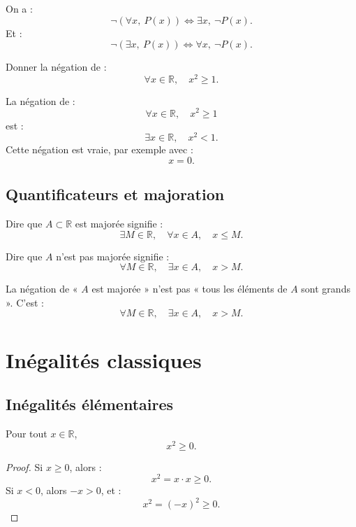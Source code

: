 \documentclass[11pt,a4paper]{article}
\newcommand{\R}{\mathbb R}
\newcommand{\ssi}{\Longleftrightarrow}
\begin{document}
\begin{theorembox}[Négation]
On a :
\[
\neg(\forall x,\ P(x))
\ssi
\exists x,\ \neg P(x).
\]
Et :
\[
\neg(\exists x,\ P(x))
\ssi
\forall x,\ \neg P(x).
\]
\end{theorembox}

\begin{exercicebox}[Négation]
Donner la négation de :
\[
\forall x\in\R,\quad x^2\geq1.
\]
\end{exercicebox}

\begin{correctionbox}
La négation de :
\[
\forall x\in\R,\quad x^2\geq1
\]
est :
\[
\exists x\in\R,\quad x^2<1.
\]
Cette négation est vraie, par exemple avec :
\[
x=0.
\]
\end{correctionbox}

\subsection{Quantificateurs et majoration}

Dire que \(A\subset\R\) est majorée signifie :
\[
\exists M\in\R,\quad \forall x\in A,\quad x\leq M.
\]

Dire que \(A\) n'est pas majorée signifie :
\[
\forall M\in\R,\quad \exists x\in A,\quad x>M.
\]

\begin{retenirbox}
La négation de « \(A\) est majorée » n'est pas « tous les éléments de \(A\) sont grands ».  
C'est :
\[
\forall M\in\R,\quad \exists x\in A,\quad x>M.
\]
\end{retenirbox}

\section{Inégalités classiques}

\subsection{Inégalités élémentaires}

\begin{theorembox}
Pour tout \(x\in\R\),
\[
x^2\geq0.
\]
\end{theorembox}

\begin{proof}
Si \(x\geq0\), alors :
\[
x^2=x\cdot x\geq0.
\]
Si \(x<0\), alors \(-x>0\), et :
\[
x^2=(-x)^2\geq0.
\]
\end{proof}
\end{document}
